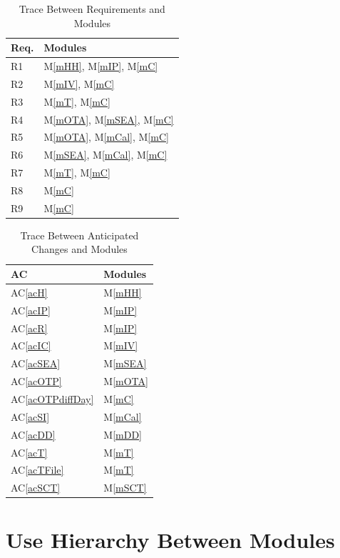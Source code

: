 \documentclass[12pt, titlepage]{article}
\newcommand{\acref}[1]{AC\ref{#1}}
\newcommand{\mref}[1]{M\ref{#1}}
\begin{document}
\begin{table}[H]
\centering
\begin{tabular}{p{} p{}}
\toprule
\textbf{Req.} & \textbf{Modules}\\
\midrule
R1 & \mref{mHH}, \mref{mIP}, \mref{mC}\\
R2 & \mref{mIV}, \mref{mC}\\
R3 & \mref{mT}, \mref{mC}\\
R4 & \mref{mOTA}, \mref{mSEA}, \mref{mC}\\
R5 & \mref{mOTA}, \mref{mCal}, \mref{mC}\\
R6 & \mref{mSEA},  \mref{mCal}, \mref{mC}\\
R7 & \mref{mT}, \mref{mC}\\
R8 & \mref{mC}\\
R9 & \mref{mC}\\
\bottomrule
\end{tabular}
\caption{Trace Between Requirements and Modules}
\label{TblRT}
\end{table}

\begin{table}[H]
\centering
\begin{tabular}{p{} p{}}
\toprule
\textbf{AC} & \textbf{Modules}\\
\midrule
\acref{acH} & \mref{mHH}\\
\acref{acIP} & \mref{mIP}\\
\acref{acR} & \mref{mIP}\\
\acref{acIC} & \mref{mIV}\\
\acref{acSEA} & \mref{mSEA}\\
\acref{acOTP} & \mref{mOTA}\\
\acref{acOTPdiffDay} & \mref{mC}\\
\acref{acSI} & \mref{mCal}\\
\acref{acDD} & \mref{mDD}\\
\acref{acT} & \mref{mT}\\
\acref{acTFile} & \mref{mT}\\
\acref{acSCT} & \mref{mSCT}\\
\bottomrule
\end{tabular}
\caption{Trace Between Anticipated Changes and Modules}
\label{TblACT}
\end{table}

\section{Use Hierarchy Between Modules} \label{SecUse}
\end{document}
